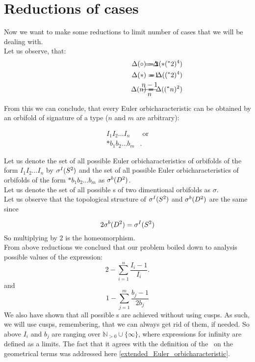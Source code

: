\section{Reductions of cases}
Now we want to make some reductions to limit number of cases that we will be dealing with. \\
Let us observe, that:
\begin{align*}
\hspace{3cm}\Delta(\circ) =& \hspace{-1cm} &-2& \hspace{-1cm} &= \Delta(*(^*2)^4) \\
\hspace{3cm}\Delta(*) =& \hspace{-1cm} &-1& \hspace{-1cm} &= \Delta((^*2)^4) \\
\hspace{3cm}\Delta(n) =& \hspace{-1cm} &\frac{n-1}{n}& \hspace{-1cm} &= \Delta((^*n)^2)
\end{align*}

From this we can conclude, that every Euler orbicharacteristic can be obtained 
by an orbifold of signature of a type ($n$ and $m$ are arbitrary):

\begin{align*}
I_1I_2\dots I_n & \textrm{\ or} \\
*b_1b_2\dots b_m &.
\end{align*}

Let us denote the set of all possible Euler orbicharacteristics of orbifolds of the form 
$I_1I_2\dots I_n$ by ${\mathcal{\sigma}^I(S^2)}$ and the set 
of all possible Euler orbicharacteristics of orbifolds of the form $*b_1b_2\dots b_m$ 
as ${\mathcal{\sigma}^b(D^2)}$. \\
Let us denote the set of all possible \Eoc s of two dimentional orbifolds as $\sigma$. \\
Let us observe that the topological structure of ${\mathcal{\sigma}^I(S^2)}$ and ${\mathcal{\sigma}^b(D^2)}$ are the same since 

\begin{equation}\label{times_two_fact}
2{\mathcal{\sigma}^b(D^2)}={\mathcal{\sigma}^I(S^2)}
\end{equation}
So multiplying by $2$ is the homeomorphism. \\
From above reductions we conclued that our problem boiled down to analysis possible 
values of the expression:
\begin{equation}
2 - \sum_{i=1}^n \frac{I_i-1}{I_i}. 
\end{equation}
and 
\begin{equation}
1 - \sum_{j=1}^m \frac{b_j-1}{2b_j}
\end{equation}
We also have shown that all possible \Eoc s are achieved without using cusps. As such, we will use 
cusps, remembering, that we can always get rid of them, if needed. So above $I_i$ and $b_j$ 
are ranging over $\mathbb{N}_{>0}\cup \{\infty\}$, where expressions for infinity are defined as 
a limits. The fact that it agrees with the definition of the \Eoc\ on the geometrical terms was 
addressed here \ref{extended_Euler_orbicharacteristic}.  

